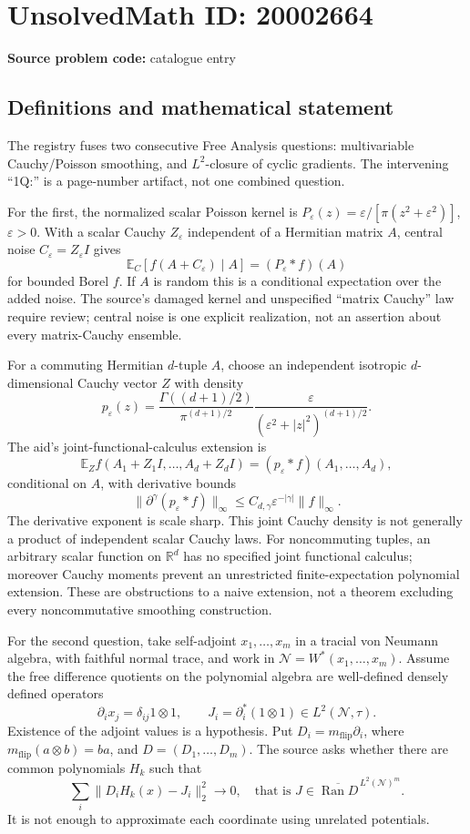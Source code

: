 \documentclass[11pt]{article}
\newcommand{\R}{\mathbb{R}}
\begin{document}
\section*{UnsolvedMath ID: 20002664}
\textbf{Source problem code:} catalogue entry
\subsection{Definitions and mathematical statement}
The registry fuses two consecutive Free Analysis questions: multivariable Cauchy/Poisson smoothing, and \(L^2\)-closure of cyclic gradients. The intervening ``1Q:'' is a page-number artifact, not one combined question.

For the first, the normalized scalar Poisson kernel is \(P_\varepsilon(z)=\varepsilon/[\pi(z^2+\varepsilon^2)]\), \(\varepsilon>0\). With a scalar Cauchy \(Z_\varepsilon\) independent of a Hermitian matrix \(A\), central noise \(C_\varepsilon=Z_\varepsilon I\) gives
\[
 \mathbb E_C[f(A+C_\varepsilon)\mid A]=(P_\varepsilon*f)(A)
\]
for bounded Borel \(f\). If \(A\) is random this is a conditional expectation over the added noise. The source's damaged kernel and unspecified ``matrix Cauchy'' law require review; central noise is one explicit realization, not an assertion about every matrix-Cauchy ensemble.

For a commuting Hermitian \(d\)-tuple \(A\), choose an independent isotropic \(d\)-dimensional Cauchy vector \(Z\) with density
\[
 p_\varepsilon(z)=\frac{\Gamma((d+1)/2)}{\pi^{(d+1)/2}}
 \frac{\varepsilon}{(\varepsilon^2+|z|^2)^{(d+1)/2}}.
\]
The aid's joint-functional-calculus extension is
\[
 \mathbb E_Z f(A_1+Z_1I,\ldots,A_d+Z_dI)
 =(p_\varepsilon*f)(A_1,\ldots,A_d),
\]
conditional on \(A\), with derivative bounds
\[
 \|\partial^\gamma(p_\varepsilon*f)\|_\infty
 \le C_{d,\gamma}\varepsilon^{-|\gamma|}\|f\|_\infty.
\]
The derivative exponent is scale sharp. This joint Cauchy density is not generally a product of independent scalar Cauchy laws. For noncommuting tuples, an arbitrary scalar function on \(\R^d\) has no specified joint functional calculus; moreover Cauchy moments prevent an unrestricted finite-expectation polynomial extension. These are obstructions to a naive extension, not a theorem excluding every noncommutative smoothing construction.

For the second question, take self-adjoint \(x_1,\ldots,x_m\) in a tracial von Neumann algebra, with faithful normal trace, and work in \(\mathcal N=W^*(x_1,\ldots,x_m)\). Assume the free difference quotients on the polynomial algebra are well-defined densely defined operators
\[
 \partial_i x_j=\delta_{ij}1\otimes1,\qquad
 J_i=\partial_i^*(1\otimes1)\in L^2(\mathcal N,\tau).
\]
Existence of the adjoint values is a hypothesis. Put \(D_i=m_{\mathrm{flip}}\partial_i\), where \(m_{\mathrm{flip}}(a\otimes b)=ba\), and \(D=(D_1,\ldots,D_m)\). The source asks whether there are common polynomials \(H_k\) such that
\[
 \sum_i\|D_iH_k(x)-J_i\|_2^2\longrightarrow0,
 \quad\text{that is }J\in\overline{\operatorname{Ran}D}^{\,L^2(\mathcal N)^m}.
\]
It is not enough to approximate each coordinate using unrelated potentials.
\end{document}
